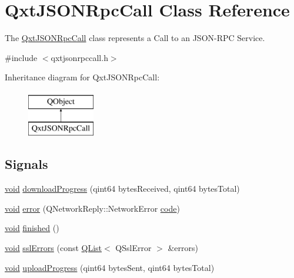 \hypertarget{class_qxt_j_s_o_n_rpc_call}{\section{Qxt\-J\-S\-O\-N\-Rpc\-Call Class Reference}
\label{class_qxt_j_s_o_n_rpc_call}
}


The \hyperlink{class_qxt_j_s_o_n_rpc_call}{Qxt\-J\-S\-O\-N\-Rpc\-Call} class represents a Call to an J\-S\-O\-N-\/\-R\-P\-C Service.  




{\ttfamily \#include $<$qxtjsonrpccall.\-h$>$}

Inheritance diagram for Qxt\-J\-S\-O\-N\-Rpc\-Call\-:\begin{figure}[H]
\begin{center}
\leavevmode
\includegraphics[height=2.000000cm]{class_qxt_j_s_o_n_rpc_call}
\end{center}
\end{figure}
\subsection*{Signals}
\begin{DoxyCompactItemize}
\item 
\hyperlink{group___u_a_v_objects_plugin_ga444cf2ff3f0ecbe028adce838d373f5c}{void} \hyperlink{class_qxt_j_s_o_n_rpc_call_a44c732d87706d4094a6dbe349e977066}{download\-Progress} (qint64 bytes\-Received, qint64 bytes\-Total)
\item 
\hyperlink{group___u_a_v_objects_plugin_ga444cf2ff3f0ecbe028adce838d373f5c}{void} \hyperlink{class_qxt_j_s_o_n_rpc_call_a6c47763660deb9597dcf14a579b9ad72}{error} (Q\-Network\-Reply\-::\-Network\-Error \hyperlink{structcode}{code})
\item 
\hyperlink{group___u_a_v_objects_plugin_ga444cf2ff3f0ecbe028adce838d373f5c}{void} \hyperlink{class_qxt_j_s_o_n_rpc_call_a5c128a14078510e6b865970ace5e4965}{finished} ()
\item 
\hyperlink{group___u_a_v_objects_plugin_ga444cf2ff3f0ecbe028adce838d373f5c}{void} \hyperlink{class_qxt_j_s_o_n_rpc_call_a685b4a7194773b9254809fe0bba8f1d1}{ssl\-Errors} (const \hyperlink{class_q_list}{Q\-List}$<$ Q\-Ssl\-Error $>$ \&errors)
\item 
\hyperlink{group___u_a_v_objects_plugin_ga444cf2ff3f0ecbe028adce838d373f5c}{void} \hyperlink{class_qxt_j_s_o_n_rpc_call_ae5e86d111a2f640cd71d9de806955988}{upload\-Progress} (qint64 bytes\-Sent, qint64 bytes\-Total)
\end{DoxyCompactItemize}
